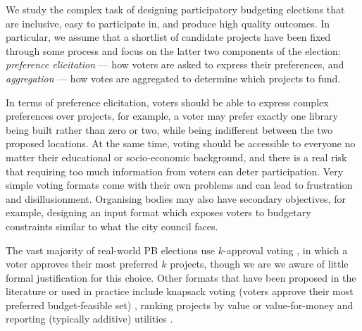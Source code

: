 \documentclass[mnsc,blindrev]{informs3_freeuse} %
\begin{document}


We study the complex task of  designing  participatory budgeting elections that are inclusive, easy to participate in, and produce high quality outcomes.   In particular, we assume that a shortlist of candidate projects have been fixed through some process and focus on the latter two components of the election: \emph{preference elicitation} ---  how voters are asked to express their preferences, and \emph{aggregation} --- how votes are aggregated to determine which projects to fund. 


In terms of preference elicitation,   voters should be able to express complex preferences over projects, for example, a voter may   prefer exactly one library being built rather than zero or two, while being indifferent between the two proposed locations. At the same time, voting should be accessible to everyone  no matter their educational or socio-economic background, and there is a real risk that requiring too much information from voters can deter   participation. 
Very simple voting formats   come with their own problems and can lead to frustration and disillusionment. 
Organising bodies  may also have secondary objectives, for example, designing an input format which exposes voters to   budgetary constraints similar to what the city council faces.  
%

The vast majority of real-world PB elections use $k$-approval voting \citep{aziz2021participatory}, in which a voter approves their most preferred $k$ projects, though we are we aware of little formal justification for this choice.  Other formats that have been proposed in the literature or used in practice include knapsack voting (voters approve their most preferred budget-feasible set)  \citep{goel2019knapsack}, ranking projects by value or value-for-money  \citep{aziz2020expanding,benade2021preference} and reporting (typically additive)  utilities \citep{peters2021proportional}. 
\end{document}
